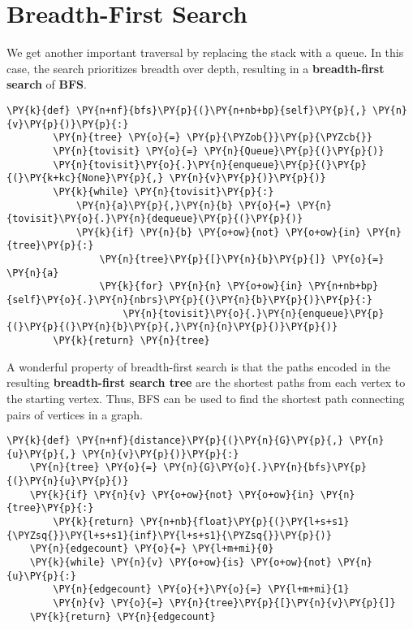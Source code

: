 \section{Breadth-First Search}


We get another important traversal by replacing the stack with a queue.
In this case, the search prioritizes breadth over depth, resulting in a \textbf{breadth-first search} of \textbf{BFS}.

\begin{Verbatim}[commandchars=\\\{\}]
    \PY{k}{def} \PY{n+nf}{bfs}\PY{p}{(}\PY{n+nb+bp}{self}\PY{p}{,} \PY{n}{v}\PY{p}{)}\PY{p}{:}
        \PY{n}{tree} \PY{o}{=} \PY{p}{\PYZob{}}\PY{p}{\PYZcb{}}
        \PY{n}{tovisit} \PY{o}{=} \PY{n}{Queue}\PY{p}{(}\PY{p}{)}
        \PY{n}{tovisit}\PY{o}{.}\PY{n}{enqueue}\PY{p}{(}\PY{p}{(}\PY{k+kc}{None}\PY{p}{,} \PY{n}{v}\PY{p}{)}\PY{p}{)}
        \PY{k}{while} \PY{n}{tovisit}\PY{p}{:}
            \PY{n}{a}\PY{p}{,}\PY{n}{b} \PY{o}{=} \PY{n}{tovisit}\PY{o}{.}\PY{n}{dequeue}\PY{p}{(}\PY{p}{)}
            \PY{k}{if} \PY{n}{b} \PY{o+ow}{not} \PY{o+ow}{in} \PY{n}{tree}\PY{p}{:}
                \PY{n}{tree}\PY{p}{[}\PY{n}{b}\PY{p}{]} \PY{o}{=} \PY{n}{a}
                \PY{k}{for} \PY{n}{n} \PY{o+ow}{in} \PY{n+nb+bp}{self}\PY{o}{.}\PY{n}{nbrs}\PY{p}{(}\PY{n}{b}\PY{p}{)}\PY{p}{:}
                    \PY{n}{tovisit}\PY{o}{.}\PY{n}{enqueue}\PY{p}{(}\PY{p}{(}\PY{n}{b}\PY{p}{,}\PY{n}{n}\PY{p}{)}\PY{p}{)}
        \PY{k}{return} \PY{n}{tree}
\end{Verbatim}



A wonderful property of breadth-first search is that the paths encoded in the resulting \textbf{breadth-first search tree} are the shortest paths from each vertex to the starting vertex.
Thus, BFS can be used to find the shortest path connecting pairs of vertices in a graph.

\begin{Verbatim}[commandchars=\\\{\}]
\PY{k}{def} \PY{n+nf}{distance}\PY{p}{(}\PY{n}{G}\PY{p}{,} \PY{n}{u}\PY{p}{,} \PY{n}{v}\PY{p}{)}\PY{p}{:}
    \PY{n}{tree} \PY{o}{=} \PY{n}{G}\PY{o}{.}\PY{n}{bfs}\PY{p}{(}\PY{n}{u}\PY{p}{)}
    \PY{k}{if} \PY{n}{v} \PY{o+ow}{not} \PY{o+ow}{in} \PY{n}{tree}\PY{p}{:}
        \PY{k}{return} \PY{n+nb}{float}\PY{p}{(}\PY{l+s+s1}{\PYZsq{}}\PY{l+s+s1}{inf}\PY{l+s+s1}{\PYZsq{}}\PY{p}{)}
    \PY{n}{edgecount} \PY{o}{=} \PY{l+m+mi}{0}
    \PY{k}{while} \PY{n}{v} \PY{o+ow}{is} \PY{o+ow}{not} \PY{n}{u}\PY{p}{:}
        \PY{n}{edgecount} \PY{o}{+}\PY{o}{=} \PY{l+m+mi}{1}
        \PY{n}{v} \PY{o}{=} \PY{n}{tree}\PY{p}{[}\PY{n}{v}\PY{p}{]}
    \PY{k}{return} \PY{n}{edgecount}
\end{Verbatim}



